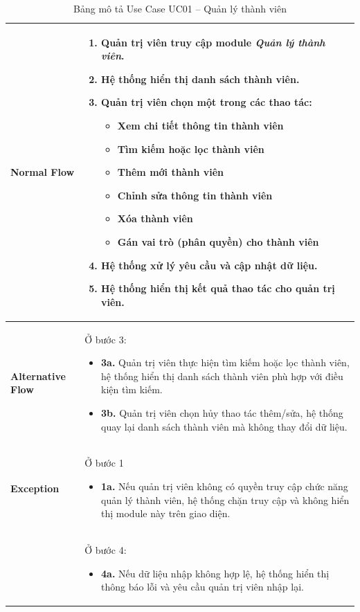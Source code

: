 \begin{table}[H]
\begin{tabular}{|m{}|m{}|}
\textbf{Normal Flow} 
&
\begin{enumerate}
    \item Quản trị viên truy cập module \textit{Quản lý thành viên}.
    \item Hệ thống hiển thị danh sách thành viên.
    \item Quản trị viên chọn một trong các thao tác:
    \begin{itemize}[label=--]
        \item Xem chi tiết thông tin thành viên
        \item Tìm kiếm hoặc lọc thành viên
        \item Thêm mới thành viên
        \item Chỉnh sửa thông tin thành viên
        \item Xóa thành viên
        \item Gán vai trò (phân quyền) cho thành viên
    \end{itemize}
    \item Hệ thống xử lý yêu cầu và cập nhật dữ liệu.
    \item Hệ thống hiển thị kết quả thao tác cho quản trị viên.
\end{enumerate}
\\ 
\hline

\textbf{Alternative Flow} 
& Ở bước 3:
\begin{itemize}[label=--]
    \item \textbf{3a.} Quản trị viên thực hiện tìm kiếm hoặc lọc thành viên, hệ thống hiển thị danh sách thành viên phù hợp với điều kiện tìm kiếm.
    \item \textbf{3b.} Quản trị viên chọn hủy thao tác thêm/sửa, hệ thống quay lại danh sách thành viên mà không thay đổi dữ liệu.
\end{itemize}
\\ 
\hline

\textbf{Exception} 
& Ở bước 1
\begin{itemize}[label=--]
    \item \textbf{1a.} Nếu quản trị viên không có quyền truy cập chức năng quản lý thành viên, hệ thống chặn truy cập và không hiển thị module này trên giao diện.
\end{itemize}
\\
& Ở bước 4:
\begin{itemize}[label=--]
    \item \textbf{4a.} Nếu dữ liệu nhập không hợp lệ, hệ thống hiển thị thông báo lỗi và yêu cầu quản trị viên nhập lại.
\end{itemize}
\\ 
\hline

\end{tabular}
\caption{Bảng mô tả Use Case UC01 – Quản lý thành viên}
\end{table}
